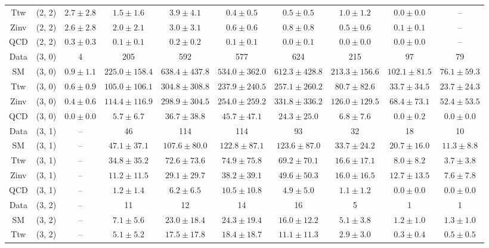 \begin{table}[h!]
{\begin{tabular}{cccccccccc}
	Ttw & (2, 2) & $2.7\pm 2.8$ & $1.5\pm 1.6$ & $3.9\pm 4.1$ & $0.4\pm 0.5$ & $0.5\pm 0.5$ & $1.0\pm 1.2$ & $0.0\pm 0.0$ & -- \\[0.5ex] 
	Zinv & (2, 2) & $2.6\pm 2.8$ & $2.0\pm 2.1$ & $3.0\pm 3.1$ & $0.6\pm 0.6$ & $0.8\pm 0.8$ & $0.5\pm 0.6$ & $0.1\pm 0.1$ & -- \\[0.5ex] 
	QCD & (2, 2) & $0.3\pm 0.3$ & $0.1\pm 0.1$ & $0.2\pm 0.2$ & $0.1\pm 0.1$ & $0.0\pm 0.1$ & $0.0\pm 0.0$ & $0.0\pm 0.0$ & -- \\[0.5ex] 
	Data & (3, 0) & 4 & 205 & 592 & 577 & 624 & 215 & 97 & 79 \\[0.5ex] 
	SM & (3, 0) & $0.9\pm 1.1$ & $225.0\pm 158.4$ & $638.4\pm 437.8$ & $534.0\pm 362.0$ & $612.3\pm 428.8$ & $213.3\pm 156.6$ & $102.1\pm 81.5$ & $76.1\pm 59.3$ \\[0.5ex] 
	Ttw & (3, 0) & $0.6\pm 0.9$ & $105.0\pm 106.1$ & $304.8\pm 308.8$ & $237.9\pm 240.5$ & $257.1\pm 260.2$ & $80.7\pm 82.6$ & $33.7\pm 34.5$ & $23.7\pm 24.3$ \\[0.5ex] 
	Zinv & (3, 0) & $0.4\pm 0.6$ & $114.4\pm 116.9$ & $298.9\pm 304.5$ & $254.0\pm 259.2$ & $331.8\pm 336.2$ & $126.0\pm 129.5$ & $68.4\pm 73.1$ & $52.4\pm 53.5$ \\[0.5ex] 
	QCD & (3, 0) & $0.0\pm 0.0$ & $5.7\pm 6.7$ & $36.7\pm 38.8$ & $45.7\pm 47.1$ & $24.3\pm 25.0$ & $6.8\pm 7.6$ & $0.0\pm 0.2$ & $0.0\pm 0.0$ \\[0.5ex] 
	Data & (3, 1) & -- & 46 & 114 & 114 & 93 & 32 & 18 & 10 \\[0.5ex] 
	SM & (3, 1) & -- & $47.1\pm 37.1$ & $107.6\pm 80.0$ & $122.8\pm 87.1$ & $123.6\pm 87.0$ & $33.7\pm 24.2$ & $20.7\pm 16.0$ & $11.3\pm 8.8$ \\[0.5ex] 
	Ttw & (3, 1) & -- & $34.8\pm 35.2$ & $72.6\pm 73.6$ & $74.9\pm 75.8$ & $69.2\pm 70.1$ & $16.6\pm 17.1$ & $8.0\pm 8.2$ & $3.7\pm 3.8$ \\[0.5ex] 
	Zinv & (3, 1) & -- & $11.2\pm 11.5$ & $29.1\pm 29.7$ & $38.2\pm 39.1$ & $49.6\pm 50.3$ & $16.0\pm 16.5$ & $12.7\pm 13.5$ & $7.6\pm 7.8$ \\[0.5ex] 
	QCD & (3, 1) & -- & $1.2\pm 1.4$ & $6.2\pm 6.5$ & $10.5\pm 10.8$ & $4.9\pm 5.0$ & $1.1\pm 1.2$ & $0.0\pm 0.0$ & $0.0\pm 0.0$ \\[0.5ex] 
	Data & (3, 2) & -- & 11 & 12 & 14 & 16 & 5 & 1 & 1 \\[0.5ex] 
	SM & (3, 2) & -- & $7.1\pm 5.6$ & $23.0\pm 18.4$ & $24.3\pm 19.4$ & $16.0\pm 12.2$ & $5.1\pm 3.8$ & $1.2\pm 1.0$ & $1.3\pm 1.0$ \\[0.5ex] 
	Ttw & (3, 2) & -- & $5.1\pm 5.2$ & $17.5\pm 17.8$ & $18.4\pm 18.7$ & $11.1\pm 11.3$ & $2.9\pm 3.0$ & $0.3\pm 0.4$ & $0.5\pm 0.5$ \\[0.5ex] 

\end{tabular}}
\end{table}
